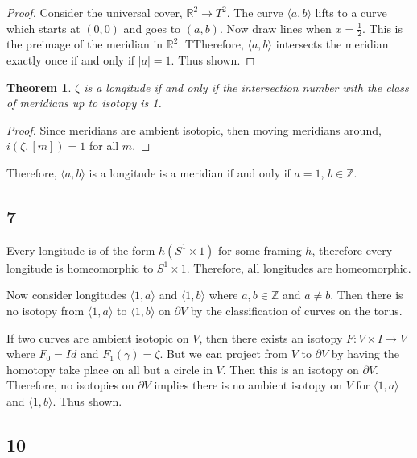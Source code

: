 \documentclass{article}
\newtheorem{theorem}{Theorem}
\theoremstyle{definition}
\numberwithin{theorem}{section}
\numberwithin{equation}{section}
\begin{document}
\begin{proof}
    Consider the universal cover, $\mathbb{R}^2 \rightarrow T^2$. The curve $\langle a, b \rangle$ lifts to a curve which starts at $(0,0)$ and goes to $(a, b)$. Now draw lines when $x = \frac{1}{2}$. This is the preimage of the meridian in $\mathbb{R}^2$. TTherefore, $\langle a, b \rangle$ intersects the meridian exactly once if and only if $|a| = 1$. Thus shown. 
\end{proof}

\begin{theorem}
    $\zeta$ is a longitude if and only if the intersection number with the class of meridians up to isotopy is 1. 
\end{theorem}

\begin{proof}
    Since meridians are ambient isotopic, then moving meridians around, $i(\zeta, [m]) = 1$ for all $m$. 
\end{proof}

Therefore, $\langle a, b \rangle$ is a longitude is a meridian if and only if $a = 1$, $b \in \mathbb{Z}$. 

\subsection{7}

Every longitude is of the form $h(S^1 \times 1)$ for some framing $h$, therefore every longitude is homeomorphic to $S^1 \times 1$. Therefore, all longitudes are homeomorphic. 

Now consider longitudes $\langle 1, a \rangle $ and $\langle 1, b \rangle$ where $a, b \in \mathbb{Z}$ and $a \neq b$. Then there is no isotopy from $\langle 1, a \rangle$ to $\langle 1, b \rangle$ on $\partial V$ by the classification of curves on the torus. 

If two curves are ambient isotopic on $V$, then there exists an isotopy $F: V \times I \rightarrow V$ where $F_0 = Id$ and $F_1(\gamma) = \zeta$. But we can project from $V$ to $\partial V$ by having the homotopy take place on all but a circle in $V$. Then this is an isotopy on $\partial V$. Therefore, no isotopies on $\partial V$ implies there is no ambient isotopy on $V$ for $\langle 1, a \rangle$ and $\langle 1, b \rangle$. Thus shown. 

\subsection{10}
\end{document}

